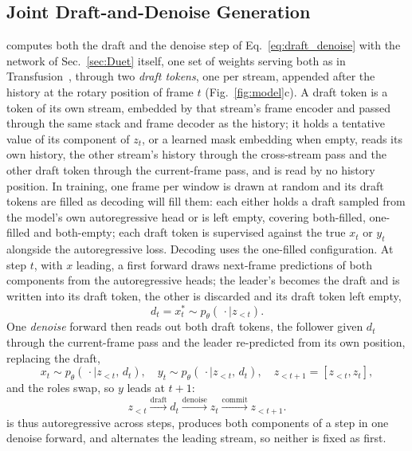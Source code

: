 
\subsection{Joint Draft-and-Denoise Generation}
\label{sec:generation}

\sys computes both the draft and the denoise step of
Eq.~\eqref{eq:draft_denoise} with the network of Sec.~\ref{sec:Duet}
itself, one set of weights serving both as in
Transfusion~\cite{transfusion}, through two \emph{draft tokens}, one
per stream, appended after the history at the rotary position of frame
$t$ (Fig.~\ref{fig:model}c). A draft token is a token of its own
stream, embedded by that stream's frame encoder and passed through the
same stack and frame decoder as the history; it holds a tentative
value of its component of $z_t$, or a learned mask embedding when
empty, reads its own history, the other stream's history through the
cross-stream pass and the other draft token through the current-frame
pass, and is read by no history position. In training, one frame per
window is drawn at random and its draft tokens are filled as decoding
will fill them: each either holds a draft sampled from the model's own
autoregressive head or is left empty, covering both-filled, one-filled
and both-empty; each draft token is supervised against the true $x_t$
or $y_t$ alongside the autoregressive loss. Decoding uses the
one-filled configuration. At step $t$, with $x$ leading, a first
forward draws next-frame predictions of both components from the
autoregressive heads; the leader's becomes the draft and is written
into its draft token, the other is discarded and its draft token left
empty,
\begin{equation}
    d_t = x_t^{*} \sim p_\theta(\,\cdot \mid z_{<t}).
    \label{eq:draft}
\end{equation}
One \emph{denoise} forward then reads out both draft tokens, the
follower given $d_t$ through the current-frame pass and the leader
re-predicted from its own position, replacing the draft,
\begin{equation}
    x_t \sim p_\theta(\,\cdot \mid z_{<t},\, d_t),
    \quad
    y_t \sim p_\theta(\,\cdot \mid z_{<t},\, d_t),
    \quad
    z_{<t+1} = [z_{<t}, z_t],
    \label{eq:denoise}
\end{equation}
and the roles swap, so $y$ leads at $t{+}1$:
\begin{equation}
    z_{<t}
    \xrightarrow{\mathrm{draft}} d_t
    \xrightarrow{\mathrm{denoise}} z_t
    \xrightarrow{\mathrm{commit}} z_{<t+1}.
    \label{eq:generation_summary}
\end{equation}
\sys is thus autoregressive across steps, produces both components of
a step in one denoise forward, and alternates the leading stream, so
neither is fixed as first.
